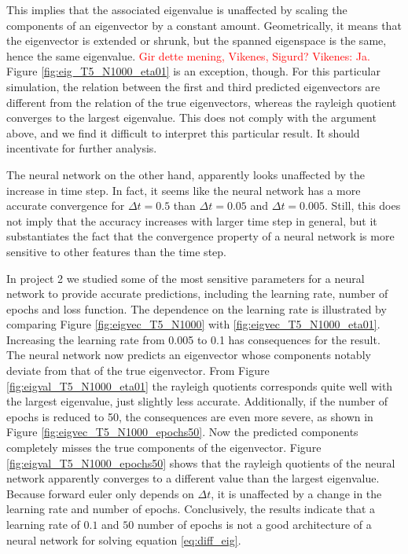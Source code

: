 \documentclass[12pt]{extarticle}
\begin{document}
This implies that the associated eigenvalue is unaffected by scaling the components of an eigenvector by a constant amount. Geometrically, it means that the eigenvector is extended or shrunk, but the spanned eigenspace is the same, hence the same eigenvalue. \textcolor{red}{Gir dette mening, Vikenes, Sigurd? Vikenes: Ja.} Figure \ref{fig:eig_T5_N1000_eta01} is an exception, though. For this particular simulation, the relation between the first and third predicted eigenvectors are different from the relation of the true eigenvectors, whereas the rayleigh quotient converges to the largest eigenvalue. This does not comply with the argument above, and we find it difficult to interpret this particular result. It should incentivate for further analysis.

The neural network on the other hand, apparently looks unaffected by the increase in time step. In fact, it seems like the neural network has a more accurate convergence for $\Delta t = 0.5$ than $\Delta t = 0.05$ and $\Delta t = 0.005$. Still, this does not imply that the accuracy increases with larger time step in general, but it substantiates the fact that the convergence property of a neural network is more sensitive to other features than the time step. 

In project 2 we studied some of the most sensitive parameters for a neural network to provide accurate predictions, including the learning rate, number of epochs and loss function. The dependence on the learning rate is illustrated by comparing Figure \ref{fig:eigvec_T5_N1000} with \ref{fig:eigvec_T5_N1000_eta01}. Increasing the learning rate from 0.005 to 0.1 has consequences for the result. The neural network now predicts an eigenvector whose components notably deviate from that of the true eigenvector. From Figure \ref{fig:eigval_T5_N1000_eta01} the rayleigh quotients corresponds quite well with the largest eigenvalue, just slightly less accurate. Additionally, if the number of epochs is reduced to 50, the consequences are even more severe, as shown in Figure \ref{fig:eigvec_T5_N1000_epochs50}. Now the predicted components completely misses the true components of the eigenvector. Figure \ref{fig:eigval_T5_N1000_epochs50} shows that the rayleigh quotients of the neural network apparently converges to a different value than the largest eigenvalue. Because forward euler only depends on $\Delta t$, it is unaffected by a change in the learning rate and number of epochs. Conclusively, the results indicate that a learning rate of $0.1$ and $50$ number of epochs is not a good architecture of a neural network for solving equation \eqref{eq:diff_eig}.
\end{document}
